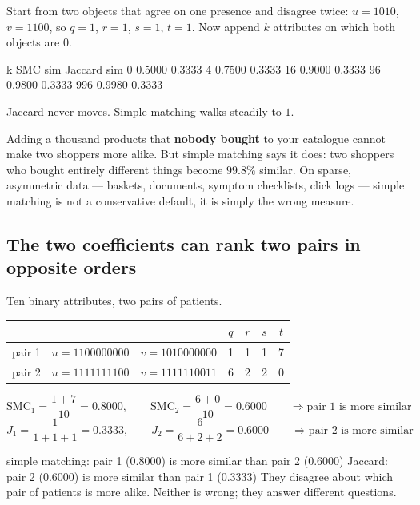 \documentclass[11pt]{article}
\begin{document}
Start from two objects that agree on one presence and disagree twice:
$u = 1010$, $v = 1100$, so $q=1$, $r=1$, $s=1$, $t=1$. Now append $k$
attributes on which both objects are $0$.

\begin{codeout}
       k    SMC sim Jaccard sim
       0     0.5000     0.3333
       4     0.7500     0.3333
      16     0.9000     0.3333
      96     0.9800     0.3333
     996     0.9980     0.3333
\end{codeout}

Jaccard never moves. Simple matching walks steadily to $1$.

\begin{keyidea}
Adding a thousand products that \textbf{nobody bought} to your catalogue
cannot make two shoppers more alike. But simple matching says it does: two
shoppers who bought entirely different things become $99.8\%$ similar. On
sparse, asymmetric data --- baskets, documents, symptom checklists,
click logs --- simple matching is not a conservative default, it is simply
the wrong measure.
\end{keyidea}

\subsection{The two coefficients can rank two pairs in opposite orders}
\label{sec:binflip}

\begin{worked}
Ten binary attributes, two pairs of patients.
\begin{center}
\begin{tabular}{lllcccc}
  \toprule
  & & & $q$ & $r$ & $s$ & $t$ \\
  \midrule
  pair 1 & $u = 1100000000$ & $v = 1010000000$ & 1 & 1 & 1 & 7 \\
  pair 2 & $u = 1111111100$ & $v = 1111110011$ & 6 & 2 & 2 & 0 \\
  \bottomrule
\end{tabular}
\end{center}
\[
  \mathrm{SMC}_1 = \frac{1+7}{10} = 0.8000, \qquad
  \mathrm{SMC}_2 = \frac{6+0}{10} = 0.6000
  \qquad \Rightarrow \text{pair 1 is more similar}
\]
\[
  J_1 = \frac{1}{1+1+1} = 0.3333, \qquad
  J_2 = \frac{6}{6+2+2} = 0.6000
  \qquad \Rightarrow \text{pair 2 is more similar}
\]
\end{worked}

\begin{codeout}
simple matching: pair 1 (0.8000) is more similar than pair 2 (0.6000)
Jaccard:         pair 2 (0.6000) is more similar than pair 1 (0.3333)
They disagree about which pair of patients is more alike.  Neither
is wrong; they answer different questions.
\end{codeout}
\end{document}
